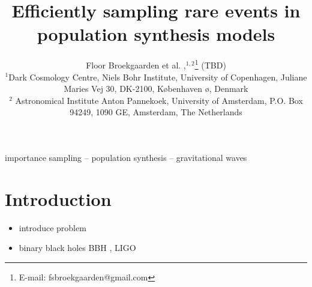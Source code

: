 \documentclass[a4paper,fleqn,usenatbib]{mnras}
\title[]{Efficiently sampling rare events in population synthesis models}
\author[]{Floor Broekgaarden et al. ,$^{1,2}$\thanks{E-mail: fsbroekgaarden@gmail.com}
(TBD)
\\
$^{1}$Dark Cosmology Centre, Niels Bohr Institute, University of
Copenhagen, Juliane Maries Vej 30, DK-2100, K\o benhaven \o,
Denmark\\
$^{2}$ Astronomical Institute Anton Pannekoek, University of Amsterdam, P.O. Box 94249, 1090 GE, Amsterdam, The Netherlands \\
}
\begin{document}
\label{firstpage}
\pagerange{\pageref{firstpage}--\pageref{lastpage}}
\maketitle

\begin{abstract}

\end{abstract}

\begin{keywords}
importance sampling -- population synthesis -- gravitational waves
\end{keywords}









\section{Introduction}
\label{sec:introduction}
%
\begin{itemize}
\item introduce problem
\item binary black holes BBH , LIGO
\end{itemize}
%
\end{document}
